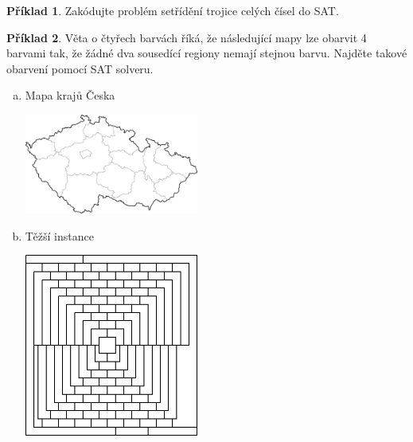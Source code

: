 \documentclass[a4paper]{article}
\theoremstyle{definition}
\newtheorem{problem}{Příklad}
\begin{document}
    
\medskip\begin{problem}
    Zakódujte problém setřídění trojice celých čísel do SAT.
\end{problem}
    
        
\medskip\begin{problem}
Věta o čtyřech barvách říká, že následující mapy lze obarvit 4 barvami tak, že žádné dva sousedící regiony nemají stejnou barvu. Najděte takové obarvení pomocí SAT solveru.
\begin{multicols}{2}
\begin{enumerate}[(a)]
    \item Mapa krajů Česka  
    
    \vfill \includegraphics[width=0.45\textwidth]{files/map-coloring-czechia.png} \vfill
    
    \item Těžší instance  
    
    \vfill \includegraphics[width=0.45\textwidth]{files/map-coloring-hard.png} \vfill
\end{enumerate}
\end{multicols}
\end{problem}
\end{document}
